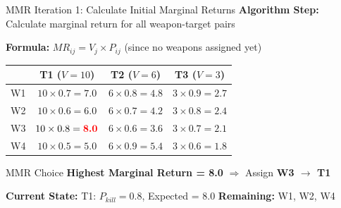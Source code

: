 \documentclass[aspectratio=43,8pt]{beamer}
\begin{document}
\begin{frame}{MMR Iteration 1: Calculate Initial Marginal Returns}
\textbf{Algorithm Step:} Calculate marginal return for all weapon-target pairs

\vspace{0.2cm}
\textbf{Formula:} $MR_{ij} = V_j \times P_{ij}$ (since no weapons assigned yet)

\vspace{0.3cm}
\begin{table}[h]
\centering
\begin{tabular}{c|ccc}
\toprule
     & T1 ($V=10$) & T2 ($V=6$) & T3 ($V=3$) \\ \midrule
W1 & $10 \times 0.7 = 7.0$ & $6 \times 0.8 = 4.8$ & $3 \times 0.9 = 2.7$ \\
W2 & $10 \times 0.6 = 6.0$ & $6 \times 0.7 = 4.2$ & $3 \times 0.8 = 2.4$ \\
W3 & $10 \times 0.8 = \textcolor{red}{\textbf{8.0}}$ & $6 \times 0.6 = 3.6$ & $3 \times 0.7 = 2.1$ \\
W4 & $10 \times 0.5 = 5.0$ & $6 \times 0.9 = 5.4$ & $3 \times 0.6 = 1.8$ \\
\bottomrule
\end{tabular}
\end{table}

\begin{alertblock}{MMR Choice}
\textbf{Highest Marginal Return = 8.0} $\Rightarrow$ Assign \textbf{W3 $\rightarrow$ T1}
\end{alertblock}

\textbf{Current State:} T1: $P_{kill} = 0.8$, Expected = 8.0 \quad \textbf{Remaining:} W1, W2, W4
\end{frame}
\end{document}
